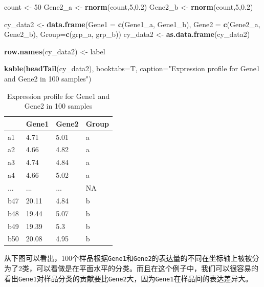 \documentclass[]{article}
\newenvironment{Shaded}{\begin{snugshade}}{\end{snugshade}}
\newcommand{\KeywordTok}[1]{\textcolor[rgb]{0.13,0.29,0.53}{\textbf{{#1}}}}
\newcommand{\DataTypeTok}[1]{\textcolor[rgb]{0.13,0.29,0.53}{{#1}}}
\newcommand{\DecValTok}[1]{\textcolor[rgb]{0.00,0.00,0.81}{{#1}}}
\newcommand{\FloatTok}[1]{\textcolor[rgb]{0.00,0.00,0.81}{{#1}}}
\newcommand{\StringTok}[1]{\textcolor[rgb]{0.31,0.60,0.02}{{#1}}}
\newcommand{\NormalTok}[1]{{#1}}
\numberwithin{figure}{section}
\numberwithin{table}{section}
\theoremstyle{definition}
\theoremstyle{definition}
\theoremstyle{definition}
\theoremstyle{remark}
\begin{document}
\begin{Shaded}
\begin{Highlighting}[]
\NormalTok{count <-}\StringTok{ }\DecValTok{50}
\NormalTok{Gene2_a <-}\StringTok{ }\KeywordTok{rnorm}\NormalTok{(count,}\DecValTok{5}\NormalTok{,}\FloatTok{0.2}\NormalTok{)}
\NormalTok{Gene2_b <-}\StringTok{ }\KeywordTok{rnorm}\NormalTok{(count,}\DecValTok{5}\NormalTok{,}\FloatTok{0.2}\NormalTok{)}

\NormalTok{cy_data2 <-}\StringTok{ }\KeywordTok{data.frame}\NormalTok{(}\DataTypeTok{Gene1 =} \KeywordTok{c}\NormalTok{(Gene1_a, Gene1_b), }\DataTypeTok{Gene2 =} \KeywordTok{c}\NormalTok{(Gene2_a, Gene2_b), }
        \DataTypeTok{Group=}\KeywordTok{c}\NormalTok{(grp_a, grp_b))}
\NormalTok{cy_data2 <-}\StringTok{ }\KeywordTok{as.data.frame}\NormalTok{(cy_data2)}

\KeywordTok{row.names}\NormalTok{(cy_data2) <-}\StringTok{ }\NormalTok{label}

\KeywordTok{kable}\NormalTok{(}\KeywordTok{headTail}\NormalTok{(cy_data2), }\DataTypeTok{booktabs=}\NormalTok{T, }
        \DataTypeTok{caption=}\StringTok{"Expression profile for Gene1 and Gene2 in 100 samples"}\NormalTok{)}
\end{Highlighting}
\end{Shaded}

\begin{table}

\caption{\label{tab:datainit2}Expression profile for Gene1 and Gene2 in 100 samples}
\centering
\begin{tabular}[t]{llll}
\toprule
  & Gene1 & Gene2 & Group\\
\midrule
a1 & 4.71 & 5.01 & a\\
a2 & 4.66 & 4.82 & a\\
a3 & 4.74 & 4.84 & a\\
a4 & 4.66 & 5.02 & a\\
... & ... & ... & NA\\
\addlinespace
b47 & 20.11 & 4.84 & b\\
b48 & 19.44 & 5.07 & b\\
b49 & 19.39 & 5.3 & b\\
b50 & 20.08 & 4.95 & b\\
\bottomrule
\end{tabular}
\end{table}

从下图可以看出，100个样品根据\texttt{Gene1}和\texttt{Gene2}的表达量的不同在坐标轴上被被分为了2类，可以看做是在平面水平的分类。而且在这个例子中，我们可以很容易的看出\texttt{Gene1}对样品分类的贡献要比\texttt{Gene2}大，因为\texttt{Gene1}在样品间的表达差异大。
\end{document}

